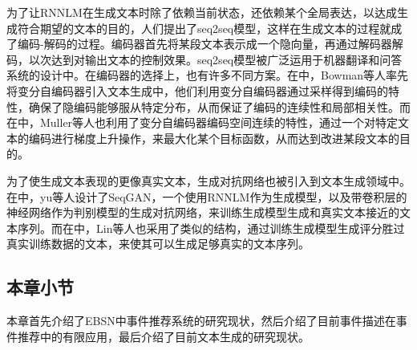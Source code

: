 \documentclass[]{template}
\begin{document}
为了让RNNLM在生成文本时除了依赖当前状态，还依赖某个全局表达，以达成生成符合期望的文本的目的，人们提出了seq2seq模型，这样在生成文本的过程就成了编码-解码的过程。编码器首先将某段文本表示成一个隐向量，再通过解码器解码，以次达到对输出文本的控制效果。seq2seq模型被广泛运用于机器翻译和问答系统的设计中。在编码器的选择上，也有许多不同方案。在\cite{bowman_generating_2015}中，Bowman等人率先将变分自编码器引入文本生成中，他们利用变分自编码器通过采样得到编码的特性，确保了隐编码能够服从特定分布，从而保证了编码的连续性和局部相关性。而在\cite{noauthor_sequence_nodate}中，Muller等人也利用了变分自编码器编码空间连续的特性，通过一个对特定文本的编码进行梯度上升操作，来最大化某个目标函数，从而达到改进某段文本的目的。

为了使生成文本表现的更像真实文本，生成对抗网络也被引入到文本生成领域中。在\cite{yu_seqgan:_2016}中，yu等人设计了SeqGAN，一个使用RNNLM作为生成模型，以及带卷积层的神经网络作为判别模型的生成对抗网络，来训练生成模型生成和真实文本接近的文本序列。而在\cite{lin_adversarial_2017}中，Lin等人也采用了类似的结构，通过训练生成模型生成评分胜过真实训练数据的文本，来使其可以生成足够真实的文本序列。

\subsection{本章小节}
本章首先介绍了EBSN中事件推荐系统的研究现状，然后介绍了目前事件描述在事件推荐中的有限应用，最后介绍了目前文本生成的研究现状。
\end{document}

